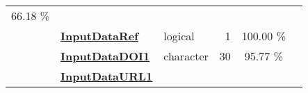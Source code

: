 \documentclass[]{article}
\begin{document}
\begin{longtable}[]{@{}lllrcl@{}}
\begin{minipage}[t]{0.10\columnwidth}
66.18 \%\strut
\end{minipage} & \begin{minipage}[t]{0.12\columnwidth}\raggedright\strut
\strut
\end{minipage}\tabularnewline
\begin{minipage}[t]{0.07\columnwidth}\raggedright\strut
\strut
\end{minipage} & \begin{minipage}[t]{0.35\columnwidth}\raggedright\strut
\textbf{\protect\hyperlink{inputdataref}{InputDataRef}}\strut
\end{minipage} & \begin{minipage}[t]{0.11\columnwidth}\raggedright\strut
logical\strut
\end{minipage} & \begin{minipage}[t]{0.10\columnwidth}\raggedleft\strut
1\strut
\end{minipage} & \begin{minipage}[t]{0.10\columnwidth}\centering\strut
100.00 \%\strut
\end{minipage} & \begin{minipage}[t]{0.12\columnwidth}\raggedright\strut
\strut
\end{minipage}\tabularnewline
\begin{minipage}[t]{0.07\columnwidth}\raggedright\strut
\strut
\end{minipage} & \begin{minipage}[t]{0.35\columnwidth}\raggedright\strut
\textbf{\protect\hyperlink{inputdatadoi1}{InputDataDOI1}}\strut
\end{minipage} & \begin{minipage}[t]{0.11\columnwidth}\raggedright\strut
character\strut
\end{minipage} & \begin{minipage}[t]{0.10\columnwidth}\raggedleft\strut
30\strut
\end{minipage} & \begin{minipage}[t]{0.10\columnwidth}\centering\strut
95.77 \%\strut
\end{minipage} & \begin{minipage}[t]{0.12\columnwidth}\raggedright\strut
\strut
\end{minipage}\tabularnewline
\begin{minipage}[t]{0.07\columnwidth}\raggedright\strut
\strut
\end{minipage} & \begin{minipage}[t]{0.35\columnwidth}\raggedright\strut
\textbf{\protect\hyperlink{inputdataurl1}{InputDataURL1}}\strut

\end{minipage}
\end{longtable}
\end{document}
